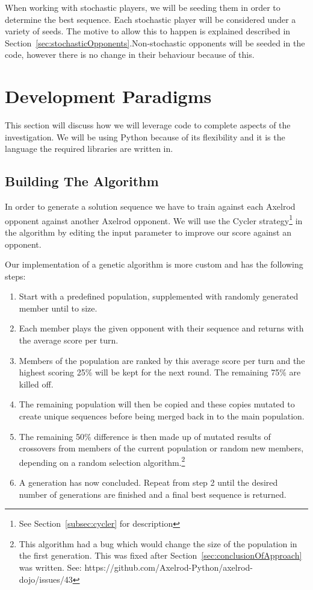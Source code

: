 When working with stochastic players, we will be seeding them in order to determine the best sequence.
Each stochastic player will be considered under a variety of seeds.
The motive to allow this to happen is explained described in Section~\ref{sec:stochasticOpponents}.Non-stochastic opponents will be seeded in the code, however there is no change in their behaviour because of this.

\section{Development Paradigms}\label{sec:codeTechniques}
This section will discuss how we will leverage code to complete aspects of the investigation.
We will be using Python because of its flexibility and it is the language the required libraries are written in.

\subsection{Building The Algorithm}\label{subsec:buildingTheAlgorthem}
In order to generate a solution sequence we have to train against each Axelrod opponent against another Axelrod opponent.
We will use the Cycler strategy\footnote{See Section~\ref{subsec:cycler} for description} in the algorithm by editing the input parameter to improve our score against an opponent.

Our implementation of a genetic algorithm is more custom and has the following steps:
\begin{enumerate}
    \item Start with a predefined population, supplemented with randomly generated member until to size.
    \item Each member plays the given opponent with their sequence and returns with the average score per turn.
    \item Members of the population are ranked by this average score per turn and the highest scoring 25\% will be kept for the next round.
    The remaining 75\% are killed off.
    \item The remaining population will then be copied and these copies mutated to create unique sequences before being merged back in to the main population.
    \item The remaining 50\% difference is then made up of mutated results of crossovers from members of the current population or random new members, depending on a random selection algorithm.\footnote{This algorithm had a bug which would change the size of the population in the first generation.
    This was fixed after Section~\ref{sec:conclusionOfApproach} was written.
    See: https://github.com/Axelrod-Python/axelrod-dojo/issues/43}
    \item A generation has now concluded.
    Repeat from step 2 until the desired number of generations are finished and a final best sequence is returned.
\end{enumerate}


